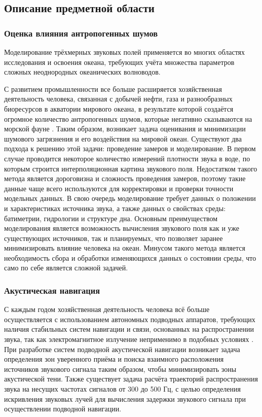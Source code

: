 \documentclass[../document.tex]{subfiles}
\begin{document}
    \subsection{Описание предметной области}
        \subsubsection{Оценка влияния антропогенных шумов}
            \par Моделирование трёхмерных звуковых полей применяется во многих областях исследования и освоения океана, требующих учёта множества параметров сложных неоднородных океанических волноводов.
            \par С развитием промышленности все больше расширяется хозяйственная деятельность человека, связанная с добычей нефти, газа и разнообразных биоресурсов в акватории мирового океана, в результате которой создаётся огромное количество антропогенных шумов, которые негативно сказываются на морской фауне \cite{noise1, noise2}. Таким образом, возникает задача оценивания и минимизации шумового загрязнения и его воздействия на мировой океан. Существуют два подхода к решению этой задачи: проведение замеров и моделирование. В первом случае проводится некоторое количество измерений плотности звука в воде, по которым строится интерполяционная картина звукового поля. Недостатком такого метода является дороговизна и сложность проведения замеров, поэтому такие данные чаще всего используются для корректировки и проверки точности модельных данных. В свою очередь моделирование требует данных о положении и характеристиках источника звука, а также данных о свойствах среды: батиметрии, гидрологии и структуре дна. Основным преимуществом моделирования является возможность вычисления звукового поля как и уже существующих источников, так и планируемых, что позволяет заранее минимизировать влияние человека на океан. Минусом такого метода является необходимость сбора и обработки изменяющихся данных о состоянии среды, что само по себе является сложной задачей.
        \subsubsection{Акустическая навигация}
            \par С каждым годом хозяйственная деятельность человека всё больше осуществляется с использованием автономных подводных аппаратов, требующих наличия стабильных систем навигации и связи, основанных на распространении звука, так как электромагнитное излучение неприменимо в подобных условиях \cite{navigation19,navigation20}. При разработке систем подводной акустической навигации возникает задача определения зон уверенного приёма и поиска взаимного расположения источников звукового сигнала таким образом, чтобы минимизировать зоны акустической тени. Также существует задача расчёта траекторий распространения звука на несущих частотах сигналов от 300 до 500 Гц, с целью определения искривления звуковых лучей для вычисления задержки звукового сигнала при осуществлении подводной навигации.
\end{document}
